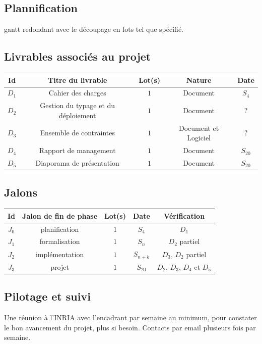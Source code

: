 \documentclass[a4paper]{article}
\begin{document}
\subsection{Plannification}
gantt redondant avec le découpage en lots tel que spécifié.
\subsection{Livrables associés au projet}
\begin{center}
\begin{tabular}{c|c|c|c|c}
	Id & Titre du livrable & Lot(s) & Nature & Date \\
	\hline
	\hline
	$D_1$ & Cahier des charges & $1$ & Document & $S_4$ \\
	\hline
	$D_2$ & Gestion du typage et du déploiement & $1$ & Document & $?$ \\
	\hline
	$D_3$ & Ensemble de contraintes & $1$ & Document et Logiciel & $?$ \\
	\hline
	$D_4$ & Rapport de management & $1$ & Document & $S_{20}$ \\
	\hline
	$D_5$ & Diaporama de présentation & $1$ & Document & $S_{20}$ \\
\end{tabular}
\end{center}

\subsection{Jalons}
\begin{center}
\begin{tabular}{c|c|c|c|c}
	Id & Jalon de fin de phase & Lot(s) & Date & Vérification \\
	\hline
	\hline
	$J_0$ & planification & $1$ & $S_4$ & $D_1$ \\
	\hline
	$J_1$ & formalisation & $1$ & $S_n$ & $D_2$ partiel \\
	\hline
	$J_2$ & implémentation & $1$ & $S_{n+k}$ & $D_3$, $D_2$ partiel \\
	\hline
	$J_3$ & projet & $1$ & $S_{20}$ & $D_2$, $D_3$, $D_4$ et $D_5$ \\
\end{tabular}
\end{center}

\subsection{Pilotage et suivi}
Une réunion à l'INRIA avec l'encadrant par semaine au minimum, pour
constater le bon avancement du projet, plus si besoin. Contacts par
email plusieurs fois par semaine.
\end{document}
